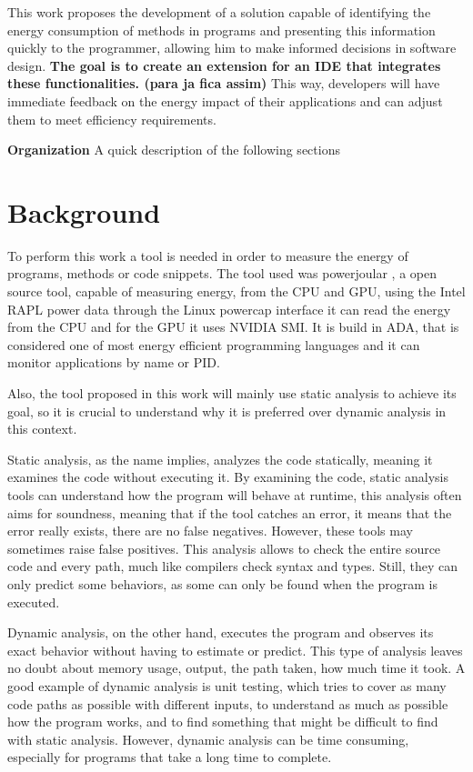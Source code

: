 \documentclass[sigplan]{acmart}
\begin{document}
This work proposes the development of a solution capable of identifying the energy consumption of methods in programs and presenting this information quickly to the programmer, allowing him to make informed decisions in software design. \textbf{The goal is to create an extension for an IDE that integrates these functionalities. (para ja fica assim)} This way, developers will have immediate feedback on the energy impact of their applications and can adjust them to meet efficiency requirements. 

\textbf{Organization} A quick description of the following sections 

\section{Background} \label{sec:background}

To perform this work a tool is needed in order to measure the energy of programs, methods or code snippets. The tool used was powerjoular \cite{noureddine-ie-2022}, a open source tool, capable of measuring energy, from the CPU and GPU, using the Intel RAPL power data through the Linux powercap interface it can read the energy from the CPU and for the GPU it uses NVIDIA SMI. It is build in ADA, that is considered one of most energy efficient programming languages and it can monitor applications by name or PID.

Also, the tool proposed in this work will mainly use static analysis to achieve its goal, so it is crucial to understand why it is preferred over dynamic analysis in this context.

Static analysis, as the name implies, analyzes the code statically, meaning it examines the code without executing it. By examining the code, static analysis tools can understand how the program will behave at runtime\cite{ernst2003static}, this analysis often aims for soundness, meaning that if the tool catches an error, it means that the error really exists, there are no false negatives. However, these tools may sometimes raise false positives. This analysis allows to check the entire source code and every path, much like compilers check syntax and types. Still, they can only predict some behaviors, as some can only be found when the program is executed.

Dynamic analysis, on the other hand, executes the program and observes its exact behavior without having to estimate or predict. This type of analysis leaves no doubt about memory usage, output, the path taken, how much time it took\cite{ernst2003static}. A good example of dynamic analysis is unit testing, which tries to cover as many code paths as possible with different inputs, to understand as much as possible how the program works, and to find something that might be difficult to find with static analysis. However, dynamic analysis can be time consuming, especially for programs that take a long time to complete.
\end{document}
